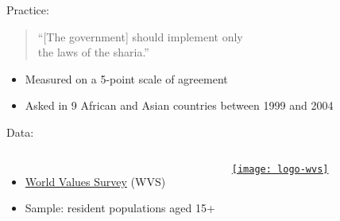 \documentclass[t]{beamer}
\begin{document}
	\begin{frame}[t]{Practice: }

		\begin{quote}
		``[The government] should implement only \\
		the laws of the sharia.''\\[1em]
		\end{quote}
		
		\begin{itemize}
			\item Measured on a 5-point scale of agreement
			\item Asked in 9 African and Asian countries between 1999 and 2004
		\end{itemize}

		\vspace{1em}
		
    Data:
	
			\begin{columns}[c]
				
				\begin{itemize}
					\item \href{http://www.worldvaluessurvey.org/wvs.jsp}{World Values Survey} (WVS)%
					\item Sample: resident populations aged 15+
				\end{itemize}
	
				\href{http://www.worldvaluessurvey.org/wvs.jsp}{\texttt{[image: logo-wvs]}}%
			\end{columns}
	
	\end{frame}

\end{document}
